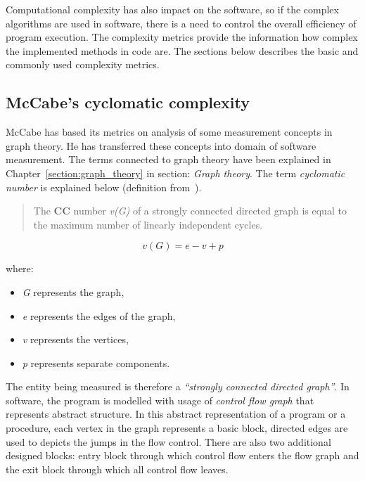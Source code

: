 Computational complexity has also impact on the software, so if the complex algorithms are used in software, there is a need to control the overall efficiency of program execution. The complexity metrics provide the information how complex the implemented methods in code are. The sections below describes the basic and commonly used complexity metrics. 
 
\subsection{McCabe's cyclomatic complexity}
\label{sec:cyclomatic}
McCabe has based its metrics on analysis of some measurement concepts in graph theory. He has  transferred these concepts into domain of software measurement. The terms connected to graph theory have been explained in Chapter~\ref{section:graph_theory} in section: \textit{Graph theory}. The term \textit{cyclomatic number} is explained below (definition from~\cite{alain}).

\begin{quote}
The \textbf{\ac{CC}} number \textit{v(G)} of a strongly connected directed graph is equal to the
maximum number of linearly independent cycles.
\end{quote}\vspace{-1cm}

\begin{equation}
v(G) = e - v + p
\end{equation}

where:
\begin{itemize}\addtolength{\itemsep}{-0.5\baselineskip}\vspace{-7mm}
\item \textit{G} represents the graph,
\item \textit{e} represents the edges of the graph,
\item \textit{v} represents the vertices,
\item \textit{p} represents separate components.
\end{itemize}

The entity being measured is therefore a \textit{``strongly connected directed graph''}. In software, the program is modelled with usage of \textit{control flow graph} that represents abstract structure. In this abstract representation of a program or a procedure, each vertex in the graph represents a basic block, directed edges are used to depicts the jumps in the flow control. There are also two additional designed blocks: entry block through which control flow enters the flow graph and the exit block through which all control flow leaves.  

